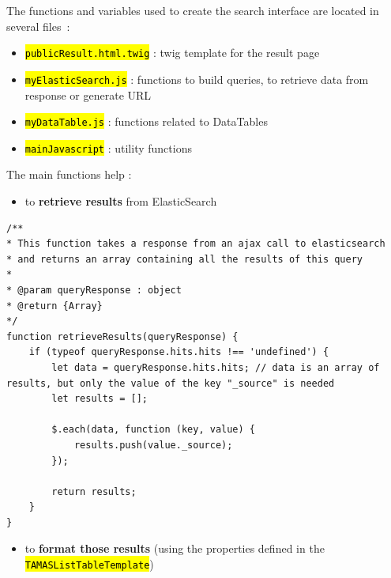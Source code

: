 \documentclass[a4paper,12pt,twoside]{book}
\let\OldTexttt\texttt
\renewcommand{\texttt}[1]{\OldTexttt{\hl{#1}}}
\begin{document}
The functions and variables used to create the search interface are located in several files~:
\begin{itemize}
	\item \texttt{publicResult.html.twig} : twig template for the result page
	\item \texttt{myElasticSearch.js} : functions to build queries, to retrieve data from response or generate URL
	\item \texttt{myDataTable.js} : functions related to DataTables
	\item \texttt{mainJavascript} : utility functions
\end{itemize}

The main functions help :
\begin{itemize}
	\item to \textbf{retrieve results} from ElasticSearch
\end{itemize}

\begin{lstlisting}
/**
* This function takes a response from an ajax call to elasticsearch
* and returns an array containing all the results of this query
*
* @param queryResponse : object
* @return {Array}
*/
function retrieveResults(queryResponse) {
    if (typeof queryResponse.hits.hits !== 'undefined') {
        let data = queryResponse.hits.hits; // data is an array of results, but only the value of the key "_source" is needed
        let results = [];

        $.each(data, function (key, value) {
            results.push(value._source);
        });

        return results;
    }
}
\end{lstlisting}

\begin{itemize}
	\item to \textbf{format those results} (using the properties defined in the \texttt{TAMASListTableTemplate})
\end{itemize}
\end{document}
